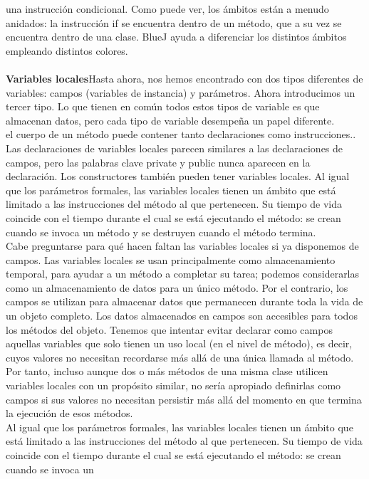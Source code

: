 \documentclass[11pt,a4paper]{article}
\begin{document}
	una instrucción condicional.
	Como puede ver, los ámbitos están a menudo anidados: la instrucción if se encuentra dentro de
	un método, que a su vez se encuentra dentro de una clase. BlueJ ayuda a diferenciar los distintos
	ámbitos empleando distintos colores.\\
	\\
	\textbf{Variables locales}Hasta ahora, nos hemos encontrado con dos tipos diferentes de variables: campos (variables de
	instancia) y parámetros. Ahora introducimos un tercer tipo. Lo que tienen en común todos estos
	tipos de variable es que almacenan datos, pero cada tipo de variable desempeña un papel diferente.\\
	el cuerpo de un método puede
	contener tanto declaraciones como instrucciones..\\
	Las declaraciones de variables locales parecen similares a las declaraciones de campos, pero las
	palabras clave private y public nunca aparecen en la declaración. Los constructores también
	pueden tener variables locales. Al igual que los parámetros formales, las variables locales tienen
	un ámbito que está limitado a las instrucciones del método al que pertenecen. Su tiempo de vida
	coincide con el tiempo durante el cual se está ejecutando el método: se crean cuando se invoca un
	método y se destruyen cuando el método termina.\\
	Cabe preguntarse para qué hacen faltan las variables locales si ya disponemos de campos. Las
	variables locales se usan principalmente como almacenamiento temporal, para ayudar a un método
	a completar su tarea; podemos considerarlas como un almacenamiento de datos para un único
	método. Por el contrario, los campos se utilizan para almacenar datos que permanecen durante toda
	la vida de un objeto completo. Los datos almacenados en campos son accesibles para todos los
	métodos del objeto. Tenemos que intentar evitar declarar como campos aquellas variables que solo
	tienen un uso local (en el nivel de método), es decir, cuyos valores no necesitan recordarse más allá
	de una única llamada al método. Por tanto, incluso aunque dos o más métodos de una misma clase
	utilicen variables locales con un propósito similar, no sería apropiado definirlas como campos si sus
	valores no necesitan persistir más allá del momento en que termina la ejecución de esos métodos.\\
	Al igual que los parámetros formales, las variables locales tienen
	un ámbito que está limitado a las instrucciones del método al que pertenecen. Su tiempo de vida
	coincide con el tiempo durante el cual se está ejecutando el método: se crean cuando se invoca un
\end{document}
